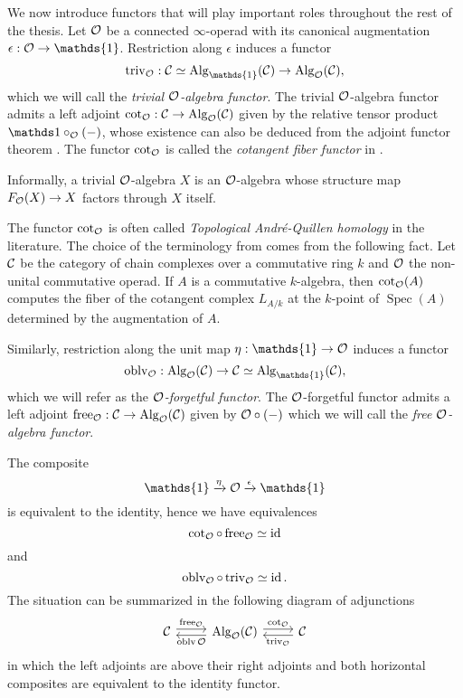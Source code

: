 We now introduce functors that will play important roles throughout the rest of the thesis. 
Let ${\mathcal{O}}$ be a connected $\infty$-operad with its canonical augmentation $\epsilon:\CO\rightarrow \mathds{1}$.
Restriction along $\epsilon$ induces a functor 
$$
\trivial_{\CO}: \CC\simeq\Alg_{\mathds{1}}(\CC)\rightarrow \Alg_{\CO}(\CC),
$$
which we will call the \emph{trivial ${\mathcal{O}}$-algebra functor}.
The trivial ${\mathcal{O}}$-algebra functor admits a left adjoint $\cot_{{\mathcal{O}}}:{\mathcal{C}}\rightarrow \operatorname{Alg}_{{\mathcal{O}}}({\mathcal{C}})$ given by the relative tensor product $\triv\circ_{\CO}(-)$, whose existence can also be deduced from the adjoint functor theorem \cite[Corollary 5.5.2.9.]{HTT}. 
The functor $\cot_{{\mathcal{O}}}$ is called the \emph{cotangent fiber functor} in \cite{Heuts_Koszul}. 
\begin{remark}
Informally, a trivial ${\mathcal{O}}$-algebra $X$ is an ${\mathcal{O}}$-algebra whose structure map 
$F_{{\mathcal{O}}}(X)\to X$ factors through $X$ itself.
\end{remark}

\begin{remark}
The functor $\cot_{{\mathcal{O}}}$ is often called \emph{Topological Andr\'e-Quillen homology} in the literature. The choice of the terminology from \cite{Heuts_Koszul}
comes from the following fact.
Let ${\mathcal{C}}$ be the category of chain complexes over a commutative ring $k$ and ${\mathcal{O}}$ the non-unital commutative operad. If $A$ is a commutative $k$-algebra, then $\cot_{{\mathcal{O}}}(A)$ computes the fiber of the cotangent complex $L_{A/k}$ at the $k$-point of $\operatorname{Spec}(A)$ determined by the augmentation of $A$.
\end{remark}


Similarly, restriction along the unit map $\eta:\mathds{1}\rightarrow \CO$ induces a functor
$$
\oblv_{\CO}: \Alg_{\CO}(\CC)
\rightarrow 
\CC\simeq\Alg_{\mathds{1}}(\CC),
$$
which we will refer as the \emph{${\mathcal{O}}$-forgetful functor}.
The ${\mathcal{O}}$-forgetful functor admits a left adjoint $\operatorname{free}_{{\mathcal{O}}}:{\mathcal{C}}\rightarrow \operatorname{Alg}_{{\mathcal{O}}}({\mathcal{C}})$ given by ${\mathcal{O}}\circ (-)$ which we will call the \emph{free ${\mathcal{O}}$-algebra functor}.
    
The composite
$$
\mathds{1}\xrightarrow{\eta} \CO \xrightarrow{\epsilon} \mathds{1}
$$
is equivalent to the identity, hence we have equivalences
$$
\cot_{{\mathcal{O}}} \circ \operatorname{free}_{{\mathcal{O}}} \simeq \operatorname{id}
$$
and 
$$
\operatorname{oblv}_{{\mathcal{O}}}\circ \operatorname{triv}_{{\mathcal{O}}} \simeq \operatorname{id}.
$$
The situation can be summarized in the following diagram of adjunctions
\[
\begin{tikzcd}
\CC & \Alg_{\CO}(\CC) & \CC
	\arrow[from=1-1, to= 1-2, shift left = 1, "\Free_{\CO}" above]
	\arrow[from=1-2, to=1-1, shift left = 1, "\oblv{\CO}" below]
	\arrow[from=1-2, to= 1-3, shift left = 1, "\cot_{\CO}" above]
	\arrow[from=1-3, to=1-2, shift left = 1, "\trivial_{\CO}" below]
\end{tikzcd}
\]
in which the left adjoints are above their right adjoints and both horizontal composites are equivalent to the identity functor.

